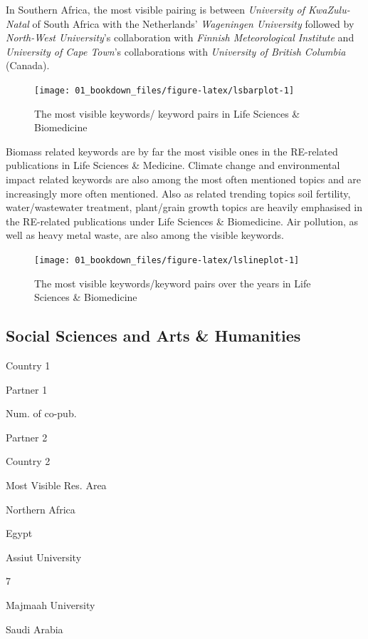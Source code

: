 \documentclass[
]{book}
\begin{document}
In Southern Africa, the most visible pairing is between \emph{University of KwaZulu-Natal} of South Africa with the Netherlands' \emph{Wageningen University} followed by \emph{North-West University}'s collaboration with \emph{Finnish Meteorological Institute} and \emph{University of Cape Town}'s collaborations with \emph{University of British Columbia} (Canada).

\begin{figure}
\texttt{[image: 01\_bookdown\_files/figure-latex/lsbarplot-1]} \caption{The most visible keywords/ keyword pairs in Life Sciences & Biomedicine}\label{fig:lsbarplot}
\end{figure}

Biomass related keywords are by far the most visible ones in the RE-related publications in Life Sciences \& Medicine. Climate change and environmental impact related keywords are also among the most often mentioned topics and are increasingly more often mentioned. Also as related trending topics soil fertility, water/wastewater treatment, plant/grain growth topics are heavily emphasised in the RE-related publications under Life Sciences \& Biomedicine. Air pollution, as well as heavy metal waste, are also among the visible keywords.

\begin{figure}
\texttt{[image: 01\_bookdown\_files/figure-latex/lslineplot-1]} \caption{The most visible keywords/keyword pairs over the years in Life Sciences & Biomedicine}\label{fig:lslineplot}
\end{figure}

\hypertarget{social-sciences-and-arts-humanities}{%
\subsection{Social Sciences and Arts \& Humanities}\label{social-sciences-and-arts-humanities}}

Country 1

Partner 1

Num. of co-pub.

Partner 2

Country 2

Most Visible Res. Area

Northern Africa

{Egypt }

{Assiut University }

{7 }

{Majmaah University }

{Saudi Arabia }
\end{document}
